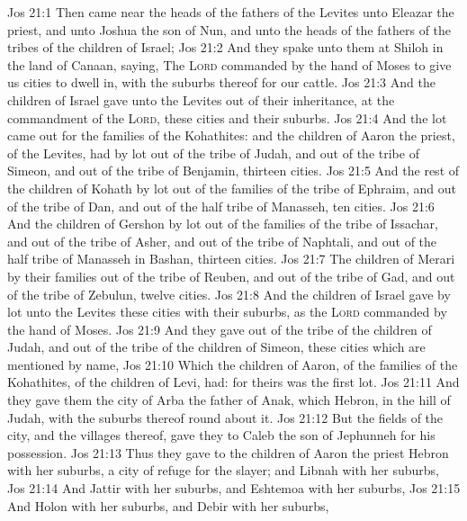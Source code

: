 \vs Jos 21:1 Then came near the heads of the fathers of the Levites unto Eleazar the priest, and unto Joshua the son of Nun, and unto the heads of the fathers of the tribes of the children of Israel;
\vs Jos 21:2 And they spake unto them at Shiloh in the land of Canaan, saying, The \textsc{Lord} commanded by the hand of Moses to give us cities to dwell in, with the suburbs thereof for our cattle.
\vs Jos 21:3 And the children of Israel gave unto the Levites out of their inheritance, at the commandment of the \textsc{Lord}, these cities and their suburbs.
\vs Jos 21:4 And the lot came out for the families of the Kohathites: and the children of Aaron the priest,  of the Levites, had by lot out of the tribe of Judah, and out of the tribe of Simeon, and out of the tribe of Benjamin, thirteen cities.
\vs Jos 21:5 And the rest of the children of Kohath  by lot out of the families of the tribe of Ephraim, and out of the tribe of Dan, and out of the half tribe of Manasseh, ten cities.
\vs Jos 21:6 And the children of Gershon  by lot out of the families of the tribe of Issachar, and out of the tribe of Asher, and out of the tribe of Naphtali, and out of the half tribe of Manasseh in Bashan, thirteen cities.
\vs Jos 21:7 The children of Merari by their families  out of the tribe of Reuben, and out of the tribe of Gad, and out of the tribe of Zebulun, twelve cities.
\vs Jos 21:8 And the children of Israel gave by lot unto the Levites these cities with their suburbs, as the \textsc{Lord} commanded by the hand of Moses.
\vs Jos 21:9 And they gave out of the tribe of the children of Judah, and out of the tribe of the children of Simeon, these cities which are  mentioned by name,
\vs Jos 21:10 Which the children of Aaron,  of the families of the Kohathites,  of the children of Levi, had: for theirs was the first lot.
\vs Jos 21:11 And they gave them the city of Arba the father of Anak, which  Hebron, in the hill  of Judah, with the suburbs thereof round about it.
\vs Jos 21:12 But the fields of the city, and the villages thereof, gave they to Caleb the son of Jephunneh for his possession.
\vs Jos 21:13 Thus they gave to the children of Aaron the priest Hebron with her suburbs,  a city of refuge for the slayer; and Libnah with her suburbs,
\vs Jos 21:14 And Jattir with her suburbs, and Eshtemoa with her suburbs,
\vs Jos 21:15 And Holon with her suburbs, and Debir with her suburbs,
